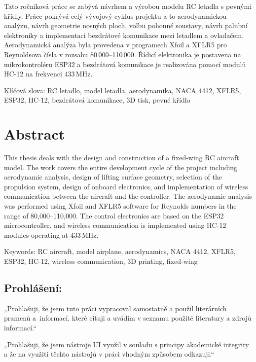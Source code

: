 \documentclass[12pt, a4paper, oneside]{report}
\begin{document}
Tato ročníková práce se zabývá návrhem a výrobou modelu RC letadla s pevnými 
křídly. Práce pokrývá celý vývojový cyklus projektu a to aerodynamickou analýzu, 
návrh geometrie nosných ploch, volbu pohonné soustavy, návrh 
palubní elektroniky a implementaci bezdrátové komunikace mezi letadlem 
a ovladačem. Aerodynamická analýza byla provedena v programech Xfoil a XFLR5 
 pro Reynoldsova čísla v rozsahu 80\,000--110\,000. Řídicí elektronika 
je postavena na mikrokontroléru ESP32 a bezdrátová komunikace je realizována 
pomocí modulů HC-12 na frekvenci 433\,MHz.

Klíčová slova: RC letadlo, model letadla, aerodynamika, NACA 4412, 
XFLR5, ESP32, HC-12, bezdrátová komunikace, 3D tisk, pevné křídlo

\newpage

\chapter*{Abstract}
\thispagestyle{empty}

This thesis deals with the design and construction of a fixed-wing RC aircraft 
model. The work covers the entire development cycle of the project including aerodynamic 
analysis, design of lifting surface geometry, selection of 
the propulsion system, design of onboard electronics, and implementation of 
wireless communication between the aircraft and the controller. The aerodynamic 
analysis was performed using Xfoil and XFLR5 software for 
Reynolds numbers in the range of 80,000--110,000. The control electronics are 
based on the ESP32 microcontroller, and wireless communication is implemented 
using HC-12 modules operating at 433\,MHz.

Keywords: RC aircraft, model airplane, aerodynamics, NACA 4412, XFLR5, 
ESP32, HC-12, wireless communication, 3D printing, fixed-wing

\newpage

\vspace*{\fill}
\section*{Prohlášení:}
„Prohlašuji, že jsem tuto práci vypracoval samostatně a použil literárních pramenů a~informací,
které cituji a uvádím v seznamu použité literatury a zdrojů informací.“
\vspace{\baselineskip}

„Prohlašuji, že jsem nástroje UI využil v souladu s principy akademické integrity a že na využití
těchto nástrojů v práci vhodným způsobem odkazuji.“
\end{document}

